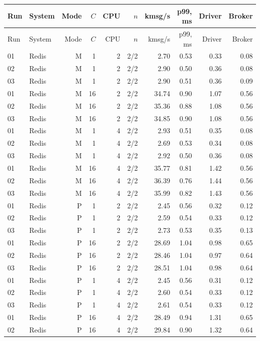 \begin{longtable}{llrrrrrrrr}
\toprule
Run & System & Mode & $C$ & CPU & $n$ & kmsg/s & p99, ms & Driver & Broker\\
\midrule
\endfirsthead
\toprule
Run & System & Mode & $C$ & CPU & $n$ & kmsg/s & p99, ms & Driver & Broker\\
\midrule
\endhead
01 & Redis & M & 1 & 2 & 2/2 & 2.70 & 0.53 & 0.33 & 0.08\\
02 & Redis & M & 1 & 2 & 2/2 & 2.90 & 0.50 & 0.36 & 0.08\\
03 & Redis & M & 1 & 2 & 2/2 & 2.90 & 0.51 & 0.36 & 0.09\\
01 & Redis & M & 16 & 2 & 2/2 & 34.74 & 0.90 & 1.07 & 0.56\\
02 & Redis & M & 16 & 2 & 2/2 & 35.36 & 0.88 & 1.08 & 0.56\\
03 & Redis & M & 16 & 2 & 2/2 & 34.85 & 0.90 & 1.08 & 0.56\\
01 & Redis & M & 1 & 4 & 2/2 & 2.93 & 0.51 & 0.35 & 0.08\\
02 & Redis & M & 1 & 4 & 2/2 & 2.69 & 0.53 & 0.34 & 0.08\\
03 & Redis & M & 1 & 4 & 2/2 & 2.92 & 0.50 & 0.36 & 0.08\\
01 & Redis & M & 16 & 4 & 2/2 & 35.77 & 0.81 & 1.42 & 0.56\\
02 & Redis & M & 16 & 4 & 2/2 & 36.39 & 0.76 & 1.44 & 0.56\\
03 & Redis & M & 16 & 4 & 2/2 & 35.99 & 0.82 & 1.43 & 0.56\\
01 & Redis & P & 1 & 2 & 2/2 & 2.45 & 0.56 & 0.32 & 0.12\\
02 & Redis & P & 1 & 2 & 2/2 & 2.59 & 0.54 & 0.33 & 0.12\\
03 & Redis & P & 1 & 2 & 2/2 & 2.73 & 0.53 & 0.35 & 0.13\\
01 & Redis & P & 16 & 2 & 2/2 & 28.69 & 1.04 & 0.98 & 0.65\\
02 & Redis & P & 16 & 2 & 2/2 & 28.46 & 1.04 & 0.97 & 0.64\\
03 & Redis & P & 16 & 2 & 2/2 & 28.51 & 1.04 & 0.98 & 0.64\\
01 & Redis & P & 1 & 4 & 2/2 & 2.45 & 0.56 & 0.31 & 0.12\\
02 & Redis & P & 1 & 4 & 2/2 & 2.60 & 0.54 & 0.33 & 0.12\\
03 & Redis & P & 1 & 4 & 2/2 & 2.61 & 0.54 & 0.33 & 0.12\\
01 & Redis & P & 16 & 4 & 2/2 & 28.49 & 0.94 & 1.31 & 0.65\\
02 & Redis & P & 16 & 4 & 2/2 & 29.84 & 0.90 & 1.32 & 0.64\\

\end{longtable}
